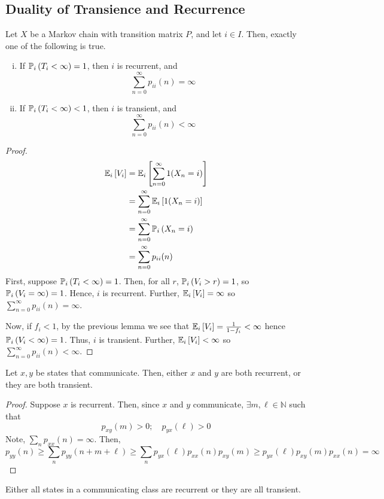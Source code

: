 \subsection{Duality of Transience and Recurrence}
\begin{theorem}
	Let \( X \) be a Markov chain with transition matrix \( P \), and let \( i \in I \).
	Then, exactly one of the following is true.
	\begin{enumerate}[(i)]
		\item If \( \mathbb{P}_{i}\left({T_i < \infty}\right) = 1 \), then \( i \) is recurrent, and
		      \[
			      \sum_{n=0}^\infty p_{ii}(n) = \infty
		      \]
		\item If \( \mathbb{P}_{i}\left({T_i < \infty}\right) < 1 \), then \( i \) is transient, and
		      \[
			      \sum_{n=0}^\infty p_{ii}(n) < \infty
		      \]
	\end{enumerate}
\end{theorem}
\begin{proof}
	\begin{align*}
		\mathbb{E}_{i}\left[{V_i}\right] & = \mathbb{E}_{i}\left[{\sum_{n=0}^\infty 1(X_n = i)}\right] \\
		              & = \sum_{n=0}^\infty \mathbb{E}_{i}\left[{1(X_n = i)}\right] \\
		              & = \sum_{n=0}^\infty \mathbb{P}_{i}\left({X_n = i}\right)    \\
		              & = \sum_{n=0}^\infty p_{ii}(n)
	\end{align*}
	First, suppose \( \mathbb{P}_{i}\left({T_i < \infty}\right) = 1 \).
	Then, for all \( r \), \( \mathbb{P}_{i}\left({V_i > r}\right) = 1 \), so \( \mathbb{P}_{i}\left({V_i = \infty}\right) = 1 \).
	Hence, \( i \) is recurrent.
	Further, \( \mathbb{E}_{i}\left[{V_i}\right] = \infty \) so \( \sum_{n=0}^\infty p_{ii}(n) = \infty \).

	Now, if \( f_i < 1 \), by the previous lemma we see that \( \mathbb{E}_{i}\left[{V_i}\right] = \frac{1}{1-f_i} < \infty \) hence \( \mathbb{P}_{i}\left({V_i < \infty}\right) = 1 \).
	Thus, \( i \) is transient.
	Further, \( \mathbb{E}_{i}\left[{V_i}\right] < \infty \) so \( \sum_{n=0}^\infty p_{ii}(n) < \infty \).
\end{proof}
\begin{theorem}
	Let \( x, y \) be states that communicate.
	Then, either \( x \) and \( y \) are both recurrent, or they are both transient.
\end{theorem}
\begin{proof}
	Suppose \( x \) is recurrent.
	Then, since \( x \) and \( y \) communicate, \( \exists m, \ell \in \mathbb N \) such that
	\[
		p_{xy}(m) > 0;\quad p_{yx}(\ell) > 0
	\]
	Note, \( \sum_n p_{xx}(n) = \infty \).
	Then,
	\[
		p_{yy}(n) \geq \sum_n p_{yy}(n+m+\ell) \geq \sum_n p_{yx}(\ell) p_{xx}(n) p_{xy}(m) \geq p_{yx}(\ell) p_{xy}(m) p_{xx}(n) = \infty
	\]
\end{proof}
\begin{corollary}
	Either all states in a communicating class are recurrent or they are all transient.
\end{corollary}

